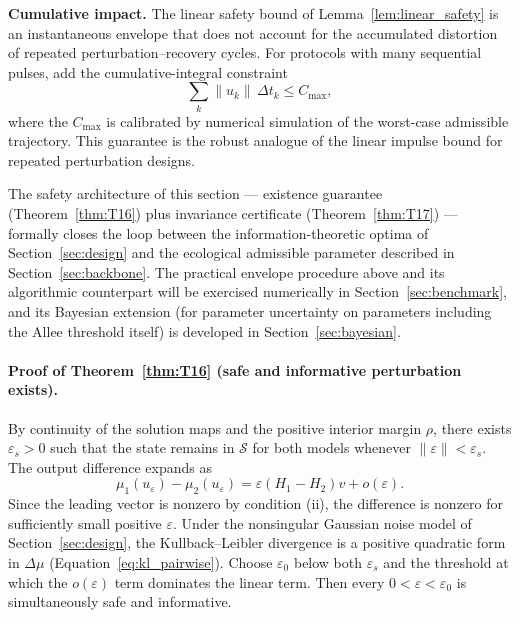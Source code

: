 \textbf{Cumulative impact.} The linear safety bound of Lemma~\ref{lem:linear_safety} is an instantaneous envelope that does not account for the accumulated distortion of repeated perturbation--recovery cycles. For protocols with many sequential pulses, add the cumulative-integral constraint
\begin{equation}
\sum_{k} \|u_k\|\, \Delta t_k \le C_{\max},
\end{equation}
where the \(C_{\max}\) is calibrated by numerical simulation of the worst-case admissible trajectory. This guarantee is the robust analogue of the linear impulse bound for repeated perturbation designs.

The safety architecture of this section --- existence guarantee (Theorem~\ref{thm:T16}) plus invariance certificate (Theorem~\ref{thm:T17}) --- formally closes the loop between the information-theoretic optima of Section~\ref{sec:design} and the ecological admissible parameter described in Section~\ref{sec:backbone}. The practical envelope procedure above and its algorithmic counterpart will be exercised numerically in Section~\ref{sec:benchmark}, and its Bayesian extension (for parameter uncertainty on parameters including the Allee threshold itself) is developed in Section~\ref{sec:bayesian}.

\paragraph{Proof of Theorem~\ref{thm:T16} (safe and informative perturbation exists).}
By continuity of the solution maps and the positive interior margin \(\rho\), there exists \(\varepsilon_s > 0\) such that the state remains in \(\mathcal{S}\) for both models whenever \(\|\varepsilon\| < \varepsilon_s\). The output difference expands as
\begin{equation}
\mu_1(u_{\varepsilon}) - \mu_2(u_{\varepsilon})
= \varepsilon (H_1 - H_2) v + o(\varepsilon).
\label{eq:output_expansion}
\end{equation}
Since the leading vector is nonzero by condition (ii), the difference is nonzero for sufficiently small positive \(\varepsilon\). Under the nonsingular Gaussian noise model of Section~\ref{sec:design}, the Kullback--Leibler divergence is a positive quadratic form in \(\Delta \mu\) (Equation~\ref{eq:kl_pairwise}). Choose \(\varepsilon_0\) below both \(\varepsilon_s\) and the threshold at which the \(o(\varepsilon)\) term dominates the linear term. Then every \(0 < \varepsilon < \varepsilon_0\) is simultaneously safe and informative.